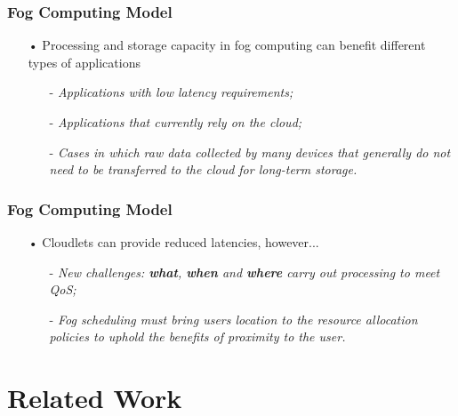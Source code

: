 \documentclass[10pt, pdf, xcolor=pdftex, dvipsnames, table]{beamer}
\begin{document}
\begin{frame}
	\frametitle{Fog Computing Model}
 	\begin{block}{}
 		\begin{itemize}
 		     \item[•] Processing and storage capacity in fog computing can benefit different types of applications\newline
 		    	\begin{itemize}
 		    		\item[-] \footnotesize\textit{Applications with low latency requirements;}\newline
 		    		\item[-] \footnotesize\textit{Applications that currently rely on the cloud;}\newline
 		    		\item[-] \footnotesize\textit{Cases in which raw data collected by many devices that generally do not need to be transferred to the cloud for long-term storage.}
 		    	\end{itemize}
 		\end{itemize}
 	\end{block}
\end{frame}

\begin{frame}
	\frametitle{Fog Computing Model}
 	\begin{block}{}
 		\begin{itemize}
 		     \item[•] Cloudlets can provide reduced latencies, however...\newline
 		    	\begin{itemize}
 		    		\item[-] \footnotesize\textit{New challenges: \textbf{what}, \textbf{when} and \textbf{where} carry out processing to meet QoS;}\newline
 		    		\item[-] \footnotesize\textit{Fog scheduling must bring users location to the resource allocation policies to uphold the benefits of proximity to the user.}
 		    	\end{itemize}
 		\end{itemize}
 	\end{block}
\end{frame}

\section[Related Work]{Related Work}
\end{document}
